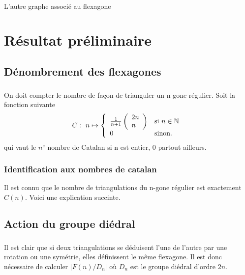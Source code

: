 \documentclass[11pt,a4paper]{report}
\begin{document}
	\paragraph{}
	L'autre graphe associé au flexagone 



	\chapter{Résultat préliminaire}
	\section{Dénombrement des flexagones} 
	\paragraph*{}
		On doit compter le nombre de façon de trianguler un n-gone régulier.
		Soit la fonction suivante
		\[ 
			C:\ n \mapsto \left\{ \begin{array}{ll}
			         \frac{1}{n+1}\left( \begin{array}{ll}
			2n \\
			 n \end{array} \right) & \mbox{si $ n \in \mathbb{N}$}\\
			         0 & \mbox{sinon}.\end{array} \right.
		\]
		qui vaut le $n^{e}$ nombre de Catalan si n est entier, 0 partout ailleurs.

	\subsection{Identification aux nombres de catalan}
	Il est connu que le nombre de triangulations du n-gone régulier est exactement $C(n)$. Voici une explication succinte.\\	
	
	\section{Action du groupe diédral}
		\paragraph{}
			Il est clair que si deux triangulations se déduisent l'une de l'autre par une rotation ou une symétrie, elles définissent le même flexagone. Il est donc nécessaire de calculer $|F(n)/D_{n}|$ où $D_{n}$ est le groupe diédral d'ordre $2n$.
\end{document}
